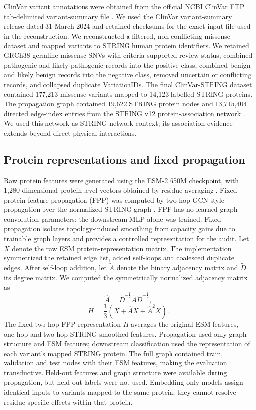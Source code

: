 \documentclass[conference]{IEEEtran}
\begin{document}
ClinVar variant annotations were obtained from the official NCBI ClinVar FTP tab-delimited variant-summary file \cite{Landrum2020ClinVar}. We used the ClinVar variant-summary release dated 31 March 2024 and retained checksums for the exact input file used in the reconstruction. We reconstructed a filtered, non-conflicting missense dataset and mapped variants to STRING human protein identifiers. We retained GRCh38 germline missense SNVs with criteria-supported review status, combined pathogenic and likely pathogenic records into the positive class, combined benign and likely benign records into the negative class, removed uncertain or conflicting records, and collapsed duplicate VariationIDs. The final ClinVar-STRING dataset contained 177,213 missense variants mapped to 14,123 labelled STRING proteins. The propagation graph contained 19,622 STRING protein nodes and 13,715,404 directed edge-index entries from the STRING v12 protein-association network \cite{Szklarczyk2023STRING}. We used this network as STRING network context; its association evidence extends beyond direct physical interactions.

\subsection{Protein representations and fixed propagation}

Raw protein features were generated using the ESM-2 650M checkpoint, with 1,280-dimensional protein-level vectors obtained by residue averaging \cite{Lin2023ESM}. Fixed protein-feature propagation (FPP) was computed by two-hop GCN-style propagation over the normalized STRING graph \cite{Kipf2017GCN}. FPP has no learned graph-convolution parameters; the downstream MLP alone was trained. Fixed propagation isolates topology-induced smoothing from capacity gains due to trainable graph layers and provides a controlled representation for the audit. Let $X$ denote the raw ESM protein-representation matrix. The implementation symmetrized the retained edge list, added self-loops and coalesced duplicate edges. After self-loop addition, let $\tilde{A}$ denote the binary adjacency matrix and $\tilde{D}$ its degree matrix. We computed the symmetrically normalized adjacency matrix as
\begin{equation}
\hat{A}=\tilde{D}^{-\frac{1}{2}}\tilde{A}\tilde{D}^{-\frac{1}{2}},
\end{equation}
\begin{equation}
H=\frac{1}{3}\left(X+\hat{A}X+\hat{A}^{2}X\right).
\end{equation}
The fixed two-hop FPP representation $H$ averages the original ESM features, one-hop and two-hop STRING-smoothed features. Propagation used only graph structure and ESM features; downstream classification used the representation of each variant's mapped STRING protein. The full graph contained train, validation and test nodes with their ESM features, making the evaluation transductive. Held-out features and graph structure were available during propagation, but held-out labels were not used. Embedding-only models assign identical inputs to variants mapped to the same protein; they cannot resolve residue-specific effects within that protein.
\end{document}
